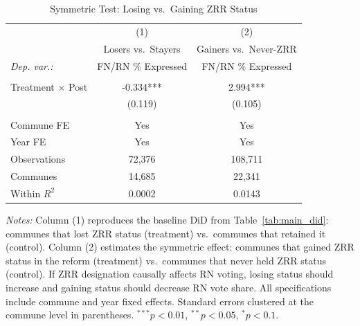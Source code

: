 \begin{table}[htbp]
\centering
\caption{Symmetric Test: Losing vs.\ Gaining ZRR Status}
\label{tab:symmetric}
\begin{tabular}{lcc}
\toprule
 & (1) & (2) \\
 & Losers vs.\ Stayers & Gainers vs.\ Never-ZRR \\
\midrule
\textit{Dep. var.:} & FN/RN \% Expressed & FN/RN \% Expressed \\
 & & \\
Treatment $\times$ Post & -0.334*** & 2.994*** \\
 & (0.119) & (0.105) \\
 & & \\
Commune FE & Yes & Yes \\
Year FE & Yes & Yes \\
\midrule
Observations & 72{,}376 & 108{,}711 \\
Communes & 14{,}685 & 22{,}341 \\
Within $R^2$ & 0.0002 & 0.0143 \\
\bottomrule
\end{tabular}
\vspace{0.3em}
\parbox{\textwidth}{\footnotesize
\textit{Notes:} Column (1) reproduces the baseline DiD from Table~\ref{tab:main_did}: communes that lost ZRR status (treatment) vs.\ communes that retained it (control).
Column (2) estimates the symmetric effect: communes that gained ZRR status in the reform (treatment) vs.\ communes that never held ZRR status (control).
If ZRR designation causally affects RN voting, losing status should increase and gaining status should decrease RN vote share.
All specifications include commune and year fixed effects. Standard errors clustered at the commune level in parentheses.
$^{***}p<0.01$, $^{**}p<0.05$, $^{*}p<0.1$.}
\end{table}
